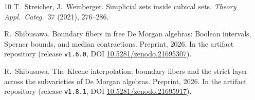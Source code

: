 \documentclass[11pt]{amsart}
\theoremstyle{definition}
\begin{document}
\begin{thebibliography}{10}
T.~Streicher, J.~Weinberger.
\newblock Simplicial sets inside cubical sets.
\newblock \emph{Theory Appl.\ Categ.}\ 37 (2021), 276--286.

R.~Shibusawa.
\newblock Boundary fibers in free De Morgan algebras: Boolean
  intervals, Sperner bounds, and median contractions.
\newblock Preprint, 2026.  In the artifact repository (release
  \texttt{v1.6.0}, DOI
  \href{https://doi.org/10.5281/zenodo.21695307}%
  {10.5281/zenodo.21695307}).

R.~Shibusawa.
\newblock The Kleene interpolation: boundary fibers and the strict
  layer across the subvarieties of De Morgan algebras.
\newblock Preprint, 2026.  In the artifact repository (release
  \texttt{v1.8.1}, DOI
  \href{https://doi.org/10.5281/zenodo.21695917}%
  {10.5281/zenodo.21695917}).

\end{thebibliography}
\end{document}
